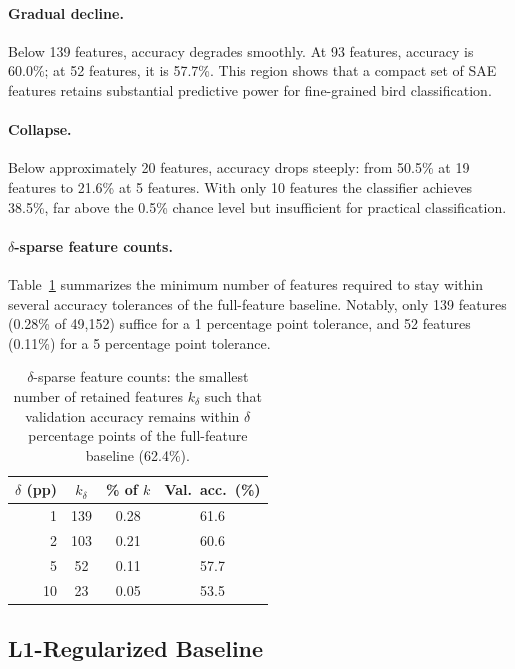 \paragraph{Gradual decline.}
Below 139 features, accuracy degrades smoothly. At 93 features, accuracy is 60.0\%; at 52 features, it is 57.7\%. This region shows that a compact set of SAE features retains substantial predictive power for fine-grained bird classification.

\paragraph{Collapse.}
Below approximately 20 features, accuracy drops steeply: from 50.5\% at 19 features to 21.6\% at 5 features. With only 10 features the classifier achieves 38.5\%, far above the 0.5\% chance level but insufficient for practical classification.

\paragraph{$\delta$-sparse feature counts.}
Table~\ref{tab:kdelta} summarizes the minimum number of features required to stay within several accuracy tolerances of the full-feature baseline. Notably, only 139 features (0.28\% of 49{,}152) suffice for a 1 percentage point tolerance, and 52 features (0.11\%) for a 5 percentage point tolerance.

\begin{table}[t]
\centering
\caption{$\delta$-sparse feature counts: the smallest number of retained features $k_\delta$ such that validation accuracy remains within $\delta$ percentage points of the full-feature baseline (62.4\%).}
\label{tab:kdelta}
\begin{tabular}{rccc}
\toprule
$\delta$ (pp) & $k_\delta$ & \% of $k$ & Val.\ acc.\ (\%) \\
\midrule
1  & 139 & 0.28 & 61.6 \\
2  & 103 & 0.21 & 60.6 \\
5  &  52 & 0.11 & 57.7 \\
10 &  23 & 0.05 & 53.5 \\
\bottomrule
\end{tabular}
\end{table}

\subsection{L1-Regularized Baseline}
\label{sec:l1_results}

